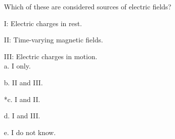 
Which of these are considered sources of electric fields?

I: Electric charges in rest.

II: Time-varying magnetic fields.

III: Electric charges in motion.\\

a. I only.

b. II and III.

*c. I and II.

d. I and III.

e. I do not know.\\
